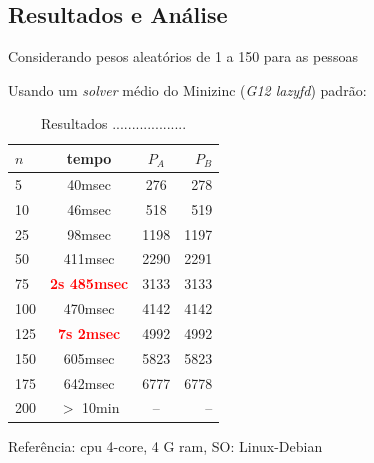 \subsection{Resultados e Análise}


Considerando pesos aleatórios de 1 a 150 para as pessoas

Usando um \textit{solver} médio do Minizinc (\textit{G12 lazyfd}) padrão:

\begin{table}
  \caption{Resultados ...................}
   \label{tab:}
  
  \begin{center}
  \begin{tabular}{ l | c |c | r }
    \hline  \hline 
    $n$ & tempo & $P_A$ & $P_B$\\ \hline     \hline 
     5 & 40msec & 276 & 278 \\ \hline
    10 & 46msec & 518 & 519 \\ \hline
    25 & 98msec & 1198 & 1197 \\ \hline
    50 & 411msec & 2290 & 2291 \\ \hline
    75 & \textbf{\textcolor{red}{2s 485msec}} & 3133 & 3133 \\ \hline
    100 & 470msec & 4142 & 4142 \\ \hline 
    125 & \textbf{\textcolor{red}{7s 2msec}} & 4992 & 4992 \\ \hline 
    150 & 605msec & 5823 & 5823 \\ \hline 
    175 & 642msec &   6777 &  6778 \\ \hline 
    200 & $>$ 10min & -- & -- \\ \hline \hline
  \end{tabular}
  
\end{center}

\end{table}
Referência: cpu 4-core, 4 G ram, SO: Linux-Debian


